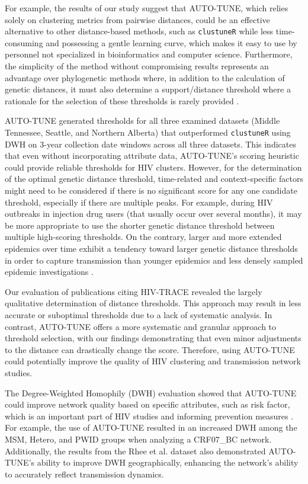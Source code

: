 \documentclass[utf8]{FrontiersinHarvard} %
\begin{document}
For example, the results of our study suggest that AUTO-TUNE, which relies
solely on clustering metrics from pairwise distances, could be an effective
alternative to other distance-based methods, such as {\tt clustuneR} while less
time-consuming and possessing a gentle learning curve, which makes it easy to
use by personnel not specialized in bioinformatics and computer science.
Furthermore, the simplicity of the method without compromising results
represents an advantage over phylogenetic methods where, in addition to the
calculation of genetic distances, it must also determine a support/distance
threshold where a rationale for the selection of these thresholds is rarely
provided \citep{junqueira_factors_2019}.

AUTO-TUNE generated thresholds for all three examined datasets (Middle
Tennessee, Seattle, and Northern Alberta) that outperformed {\tt clustuneR}
using DWH on 3-year collection date windows across all three datasets. This
indicates that even without incorporating attribute data, AUTO-TUNE's scoring
heuristic could provide reliable thresholds for HIV clusters. However, for the
determination of the optimal genetic distance threshold, time-related and
context-specific factors might need to be considered if there is no significant
score for any one candidate threshold, especially if there are multiple peaks.
For example, during HIV outbreaks in injection drug users (that usually occur
over several months), it may be more appropriate to use the shorter genetic
distance threshold \citep{peters_hiv_2016,campbell_detailed_2017} between
multiple high-scoring thresholds. On the contrary, larger and more extended
epidemics over time exhibit a tendency toward larger genetic distance
thresholds in order to capture transmission than younger epidemics and less
densely sampled epidemic investigations
\citep{patil_exploring_2022,leung_molecular_2019,di_giallonardo_subtype-specific_2021}.

Our evaluation of publications citing HIV-TRACE revealed the largely
qualitative determination of distance thresholds. This approach may result in
less accurate or suboptimal thresholds due to a lack of systematic analysis. In
contrast, AUTO-TUNE offers a more systematic and granular approach to threshold
selection, with our findings demonstrating that even minor adjustments to the
distance can drastically change the score. Therefore, using AUTO-TUNE could
potentially improve the quality of HIV clustering and transmission network
studies.

The Degree-Weighted Homophily (DWH) evaluation showed that AUTO-TUNE could
improve network quality based on specific attributes, such as risk factor,
which is an important part of HIV studies and informing prevention measures
\citep{potterat_risk_2002,fujimoto_methodological_2021}. For example, the use
of AUTO-TUNE resulted in an increased DWH among the MSM, Hetero, and PWID
groups when analyzing a CRF07\_BC network. Additionally, the results from the
Rhee et al. dataset also demonstrated AUTO-TUNE's ability to improve DWH
geographically, enhancing the network's ability to accurately reflect
transmission dynamics.
\end{document}
